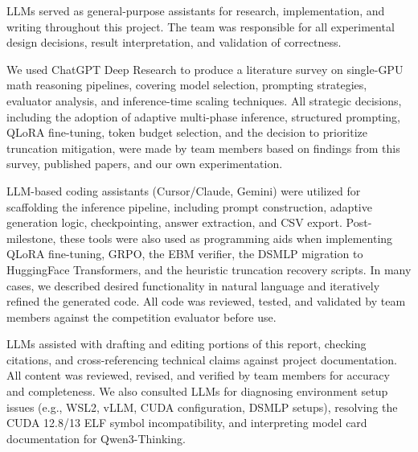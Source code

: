 \documentclass{article}
\begin{document}
LLMs served as general-purpose assistants for research, implementation, and writing throughout this project. The team was responsible for all experimental design decisions, result interpretation, and validation of correctness.

We used ChatGPT Deep Research to produce a literature survey on single-GPU math reasoning pipelines, covering model selection, prompting strategies, evaluator analysis, and inference-time scaling techniques. All strategic decisions, including the adoption of adaptive multi-phase inference, structured prompting, QLoRA fine-tuning, token budget selection, and the decision to prioritize truncation mitigation, were made by team members based on findings from this survey, published papers, and our own experimentation.

LLM-based coding assistants (Cursor/Claude, Gemini) were utilized for scaffolding the inference pipeline, including prompt construction, adaptive generation logic, checkpointing, answer extraction, and CSV export. Post-milestone, these tools were also used as programming aids when implementing QLoRA fine-tuning, GRPO, the EBM verifier, the DSMLP migration to HuggingFace Transformers, and the heuristic truncation recovery scripts. In many cases, we described desired functionality in natural language and iteratively refined the generated code. All code was reviewed, tested, and validated by team members against the competition evaluator before use. 

LLMs assisted with drafting and editing portions of this report, checking citations, and cross-referencing technical claims against project documentation. All content was reviewed, revised, and verified by team members for accuracy and completeness. We also consulted LLMs for diagnosing environment setup issues (e.g., WSL2, vLLM, CUDA configuration, DSMLP setups), resolving the CUDA 12.8/13 ELF symbol incompatibility, and interpreting model card documentation for Qwen3-Thinking.


% 
% 
\end{document}
